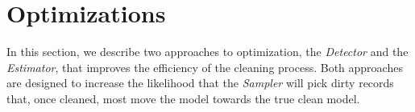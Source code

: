 \section{Optimizations}\label{opti}


In this section, we describe two approaches to optimization, the {\it Detector} and the {\it Estimator}, that
improves the efficiency of the cleaning process.  
Both approaches are designed to increase the likelihood that the 
{\it Sampler} will pick dirty records that, once cleaned,
most move the model towards the true clean model.




